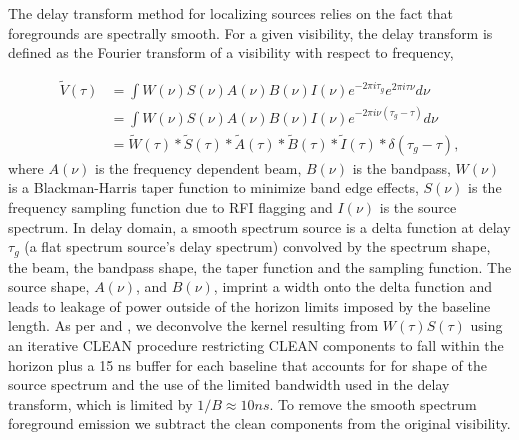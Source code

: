 \documentclass[twocolumn,numberedappendix]{emulateapj} \shorttitle{PSA64}
\begin{document}
The delay transform method for localizing sources relies on the fact that
foregrounds are spectrally smooth. For a given visibility, the delay transform
is defined as the Fourier transform of a visibility with respect to frequency, 

\begin{align}\label{eqn:delay_transform}
\tilde{V}(\tau) &= \int{W(\nu)S(\nu)A(\nu)B(\nu)I(\nu)
                   e^{-2\pi{i}\tau_{g}}e^{2\pi{i}\tau\nu}d\nu} \\
                &= \int{W(\nu)S(\nu)A(\nu)B(\nu)I(\nu)
                   e^{-2\pi{i}\nu(\tau_{g}-\tau)}d\nu} \\
                &= \tilde{W}(\tau) \ast\tilde{S}(\tau) \ast \tilde{A}(\tau) \ast
                   \tilde{B}(\tau) \ast \tilde{I}(\tau) \ast
                   \delta(\tau_{g} - \tau),
\end{align}
where $A(\nu)$ is the frequency dependent beam, $B(\nu)$ is the bandpass,
$W(\nu)$ is a Blackman-Harris taper function to minimize band edge effects,
$S(\nu)$ is the frequency sampling function due to RFI flagging  and $I(\nu)$ is
the source spectrum. In delay domain, a smooth spectrum source is a delta
function at delay $\tau_{g}$ (a flat spectrum source's delay spectrum)
convolved by the spectrum shape, the beam, the bandpass shape, the taper
function and the sampling function. The source shape, $A(\nu)$, and $B(\nu)$,
imprint a width onto the delta function and leads to leakage of power outside
of the horizon limits imposed by the baseline length.  As per
\cite{parsons_et_al2009} and \cite{parsons_et_al2014}, we deconvolve the kernel
resulting from $W(\tau)S(\tau)$ using an iterative CLEAN procedure
\citep{hogbom1974} restricting CLEAN components to fall within the horizon plus
a 15 ns buffer for each baseline that accounts for for shape of the source
spectrum and the use of the limited bandwidth used in the delay transform,
which is limited by $1/B \approx 10 ns$. To remove the smooth spectrum
foreground emission we subtract the clean components from the original
visibility.
\end{document}
